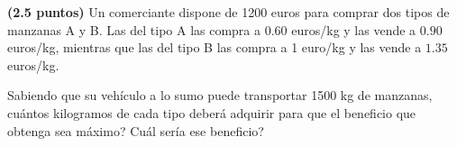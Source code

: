 
\textbf{(2.5 puntos)} Un comerciante dispone de 1200 euros para comprar dos tipos de manzanas A y B. Las del tipo A las compra a $0.60$ euros/kg y las vende a $0.90$ euros/kg, mientras que las del tipo B las compra a 1 euro/kg y las vende a $1.35$ euros/kg.

Sabiendo que su vehículo a lo sumo puede transportar 1500 kg de manzanas, \textquestiondown{}cuántos kilogramos de cada tipo deberá adquirir para que el beneficio que obtenga sea máximo? \textquestiondown{}Cuál sería ese beneficio?
